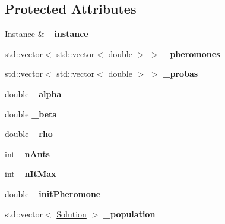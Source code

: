 \subsection*{Protected Attributes}
\begin{DoxyCompactItemize}
\item 
\hyperlink{classInstance}{Instance} \& {\bfseries \+\_\+instance}\hypertarget{classAntColony_a64fae61f3585bce39f18edcb513c28e8}{}\label{classAntColony_a64fae61f3585bce39f18edcb513c28e8}

\item 
std\+::vector$<$ std\+::vector$<$ double $>$ $>$ {\bfseries \+\_\+pheromones}\hypertarget{classAntColony_a0d2af45829aeb7bd19fc8f8741f32941}{}\label{classAntColony_a0d2af45829aeb7bd19fc8f8741f32941}

\item 
std\+::vector$<$ std\+::vector$<$ double $>$ $>$ {\bfseries \+\_\+probas}\hypertarget{classAntColony_ae285306ac1aaea3844448e8879a04bb0}{}\label{classAntColony_ae285306ac1aaea3844448e8879a04bb0}

\item 
double {\bfseries \+\_\+alpha}\hypertarget{classAntColony_ae9ff3102a578e730bdf16e4680d3280d}{}\label{classAntColony_ae9ff3102a578e730bdf16e4680d3280d}

\item 
double {\bfseries \+\_\+beta}\hypertarget{classAntColony_a109ba28344e92f638aabc7eb1bf4da9d}{}\label{classAntColony_a109ba28344e92f638aabc7eb1bf4da9d}

\item 
double {\bfseries \+\_\+rho}\hypertarget{classAntColony_aca1f3f8d4085e68b6fd8b12a71ea559c}{}\label{classAntColony_aca1f3f8d4085e68b6fd8b12a71ea559c}

\item 
int {\bfseries \+\_\+n\+Ants}\hypertarget{classAntColony_a76d71655f20d93f0915d8d939634e848}{}\label{classAntColony_a76d71655f20d93f0915d8d939634e848}

\item 
int {\bfseries \+\_\+n\+It\+Max}\hypertarget{classAntColony_aa4129fea711c1334358a5d4930dbe528}{}\label{classAntColony_aa4129fea711c1334358a5d4930dbe528}

\item 
double {\bfseries \+\_\+init\+Pheromone}\hypertarget{classAntColony_ab231303b4d50c579a545c32c2010e09a}{}\label{classAntColony_ab231303b4d50c579a545c32c2010e09a}

\item 
std\+::vector$<$ \hyperlink{classSolution}{Solution} $>$ {\bfseries \+\_\+population}\hypertarget{classAntColony_acfbcfba26264cc0b1a16e3940adb67d3}{}\label{classAntColony_acfbcfba26264cc0b1a16e3940adb67d3}

\end{DoxyCompactItemize}


